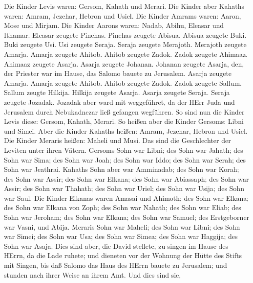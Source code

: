  Die Kinder Levis waren: Gersom, Kahath und Merari.
 Die Kinder aber Kahaths waren: Amram, Jezehar, Hebron und
Usiel.  Die Kinder Amrams waren: Aaron, Mose und Mirjam. Die
Kinder Aarons waren: Nadab, Abihu, Eleasar und Ithamar. 
Eleasar zeugete Pinehas. Pinehas zeugete Abisua.  Abisua
zeugete Buki. Buki zeugete Usi.  Usi zeugete Seraja. Seraja
zeugete Merajoth.  Merajoth zeugete Amarja. Amarja zeugete
Ahitob.  Ahitob zeugete Zadok. Zadok zeugete Ahimaaz.
 Ahimaaz zeugete Asarja. Asarja zeugete Johanan.
 Johanan zeugete Asarja, den, der Priester war im Hause,
das Salomo bauete zu Jerusalem.  Asarja zeugete Amarja.
Amarja zeugete Ahitob.  Ahitob zeugete Zadok. Zadok zeugete
Sallum.  Sallum zeugte Hilkija. Hilkija zeugete Asarja.
 Asarja zeugete Seraja. Seraja zeugete Jozadak.
 Jozadak aber ward mit weggeführet, da der HErr Juda und
Jerusalem durch Nebukadnezar ließ gefangen wegführen.  So
sind nun die Kinder Levis diese: Gersom, Kahath, Merari. 
So heißen aber die Kinder Gersoms: Libni und Simei.  Aber
die Kinder Kahaths heißen: Amram, Jezehar, Hebron und Usiel.
 Die Kinder Meraris heißen: Maheli und Musi. Das sind die
Geschlechter der Leviten unter ihren Vätern.  Gersoms Sohn
war Libni; des Sohn war Jahath; des Sohn war Sima;  des
Sohn war Joah; des Sohn war Iddo; des Sohn war Serah; des Sohn war
Jeathrai.  Kahaths Sohn aber war Amminadab; des Sohn war
Korah; des Sohn war Assir;  des Sohn war Elkana; des Sohn
war Abiassaph; des Sohn war Assir;  des Sohn war Thahath;
des Sohn war Uriel; des Sohn war Usija; des Sohn war Saul. 
Die Kinder Elkanas waren Amasai und Ahimoth;  des Sohn war
Elkana; des Sohn war Elkana von Zoph; des Sohn war Nahath; 
des Sohn war Eliab; des Sohn war Jeroham; des Sohn war Elkana;
 des Sohn war Samuel; des Erstgeborner war Vasni, und
Abija.  Meraris Sohn war Maheli; des Sohn war Libni; des
Sohn war Simei; des Sohn war Usa;  des Sohn war Simea; des
Sohn war Haggija; des Sohn war Asaja.  Dies sind aber, die
David stellete, zu singen im Hause des HErrn, da die Lade ruhete;
 und dieneten vor der Wohnung der Hütte des Stifts mit
Singen, bis daß Salomo das Haus des HErrn bauete zu Jerusalem; und
stunden nach ihrer Weise an ihrem Amt.  Und dies sind sie,
